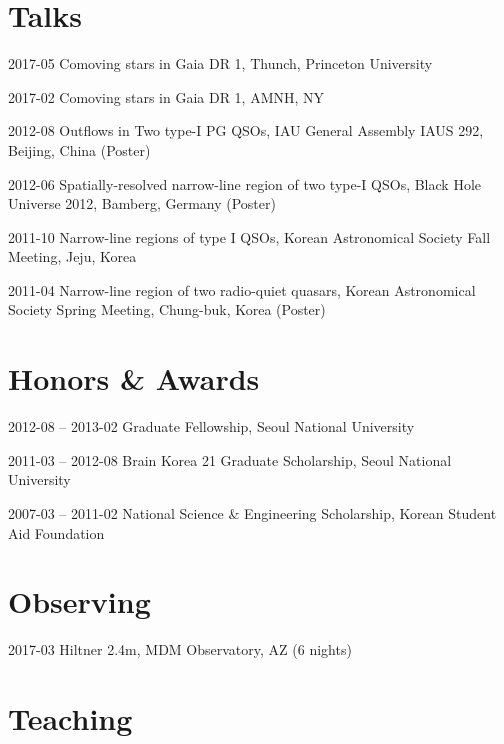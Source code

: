 \documentclass[11pt,letterpaper]{article}
\renewenvironment{itemize}{
  \begin{list}{}{
    \setlength{\leftmargin}{1.5em}
  }
}{
  \end{list}
}
\begin{document}
\section*{Talks}

\begin{etaremune}
  \setlength\itemsep{0em}
  \item 2017-05 Comoving stars in Gaia DR 1, Thunch, Princeton University
  \item 2017-02 Comoving stars in Gaia DR 1, AMNH, NY
  \item 2012-08 Outflows in Two type-I PG QSOs, IAU General Assembly IAUS 292, Beijing, China (Poster)
  \item 2012-06 Spatially-resolved narrow-line region of two type-I QSOs, Black Hole Universe 2012, Bamberg, Germany (Poster)
  \item 2011-10 Narrow-line regions of type I QSOs, Korean Astronomical Society Fall Meeting, Jeju, Korea
  \item 2011-04 Narrow-line region of two radio-quiet quasars, Korean Astronomical Society Spring Meeting, Chung-buk, Korea (Poster)
\end{etaremune}

\section*{Honors \& Awards}

\begin{itemize}
  \setlength\itemsep{0em}
  \item 2012-08 -- 2013-02 Graduate Fellowship, Seoul National University
  \item 2011-03 -- 2012-08 Brain Korea 21 Graduate Scholarship, Seoul National University
  \item 2007-03 -- 2011-02 National Science \& Engineering Scholarship, Korean Student Aid Foundation
\end{itemize}

\section*{Observing}
\begin{itemize}
  \item 2017-03 Hiltner 2.4m, MDM Observatory, AZ (6 nights)
\end{itemize}

\section*{Teaching}
\end{document}
